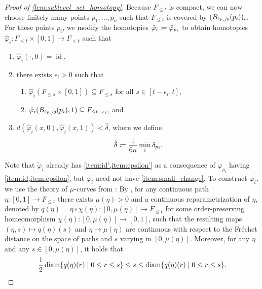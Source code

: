 \begin{proof}[Proof of \cref{lem:sublevel_set_homotopy}]
	Because $F_{\leq t}$ is compact, we can now choose finitely many points $p_{1}, \dots, p_{n}$ such that $F_{\leq t}$ is covered by $( B_{\nicefrac{\delta_{p_{i}}}{6}}(p_{i}))_{i}$.
	For these points $p_{i}$, we modify the homotopies $\tilde{\varphi}_{i} \coloneqq \tilde{\varphi}_{p_{i}}$ to obtain homotopies $\hat{\varphi}_{i} \colon F_{\leq t} \times [0,1] \to F_{\leq t}$ such that 
	\begin{enumerate}[label={(\arabic*')}]
		\item \label{item:id'} $\hat{\varphi}_{i}(\cdot,0) = \operatorname{id}$,
		\item \label{item:epsilon'} there exists $\epsilon_{i} > 0$ such that
		\begin{enumerate}[label={(\alph*)}, ref={(\arabic{enumi}'\alph*)}]
			\item \label{item:s_below_s'} $\hat{\varphi}_{i}(F_{\leq s} \times [0,1]) \subseteq F_{\leq s}$ for all $s \in [t - \epsilon_{i}, t]$, 
			\item \label{item:contracting'} $\hat{\varphi}_{i}(B_{\nicefrac{\delta_{p_{i}}}{3}}(p_{i}), 1) \subseteq F_{\leq t - \epsilon_{i}}$, and
		\end{enumerate}
		\item \label{item:small_change} $d(\hat{\varphi}_{i}(x, 0), \hat{\varphi}_{i}(x,1)) < \hat{\delta}$,
			where we define 
			\[
				\hat{\delta} \coloneqq \frac{1}{6n} \min_{i} \delta_{p_{i}}.
			\]
	\end{enumerate}
	Note that $\tilde{\varphi}_{i}$ already has \cref{item:id',item:epsilon'} as a consequence of $\varphi_{p_{i}}$ having \cref{item:id,item:epsilon}, but $\tilde{\varphi}_{i}$ need not have \cref{item:small_change}.
	To construct $\hat{\varphi}_{i}$, we use the theory of $\mu$-curves from \cite{Morse.1936}: 
	By \cite{Morse.1936}, for any continuous path $\eta \colon [0,1] \to F_{\leq t}$ there exists $\mu(\eta) > 0$ and a continuous reparametrization of $\eta$, denoted by $q(\eta) = \eta \circ \chi(\eta) \colon [0, \mu(\eta)] \to F_{\leq t}$ for some order-preserving homeomorphism $\chi(\eta) \colon [0, \mu(\eta)] \to [0,1]$, such that the resulting maps $(\eta,s) \mapsto q(\eta)(s)$ and $\eta \mapsto \mu(\eta)$ are continuous with respect to the Fr\'echet distance on the space of paths and $s$ varying in $[0, \mu(\eta)]$. 
	Moreover, for any $\eta$ and any $s \in [0, \mu(\eta)]$, it holds that
	\begin{equation}\label{eq:mu_param}
		\frac{1}{2}\diam\{q(\eta)(r) \mid 0 \leq r \leq s\} \leq s \leq \diam\{q(\eta)(r) \mid 0 \leq r \leq s\}.

\end{equation}
\end{proof}

